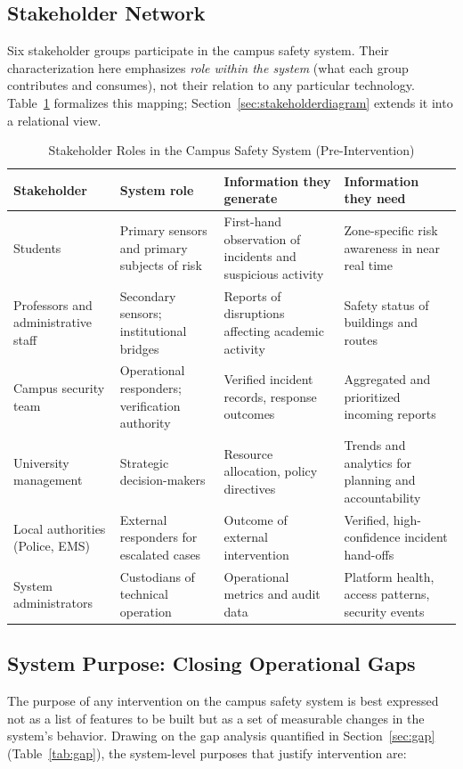 \documentclass[conference]{IEEEtran}
\begin{document}
\subsection{Stakeholder Network}
\label{sec:stakeholders}
Six stakeholder groups participate in the campus safety system. Their
characterization here emphasizes \emph{role within the system} (what
each group contributes and consumes), not their relation to any
particular technology. Table~\ref{tab:stakeholders} formalizes this
mapping; Section~\ref{sec:stakeholderdiagram} extends it into a
relational view.

\begin{table}[t]
\caption{Stakeholder Roles in the Campus Safety System (Pre-Intervention)}
\label{tab:stakeholders}
\centering
\renewcommand{\arraystretch}{1.2}
\begin{tabular}{p{2.9cm}p{4.2cm}p{4.6cm}p{4.4cm}}
\toprule
\textbf{Stakeholder} & \textbf{System role} & \textbf{Information they generate} & \textbf{Information they need} \\
\midrule
Students & Primary sensors and primary subjects of risk & First-hand observation of incidents and suspicious activity & Zone-specific risk awareness in near real time \\
Professors and administrative staff & Secondary sensors; institutional bridges & Reports of disruptions affecting academic activity & Safety status of buildings and routes \\
Campus security team & Operational responders; verification authority & Verified incident records, response outcomes & Aggregated and prioritized incoming reports \\
University management & Strategic decision-makers & Resource allocation, policy directives & Trends and analytics for planning and accountability \\
Local authorities (Police, EMS) & External responders for escalated cases & Outcome of external intervention & Verified, high-confidence incident hand-offs \\
System administrators & Custodians of technical operation & Operational metrics and audit data & Platform health, access patterns, security events \\
\bottomrule
\end{tabular}
\end{table}

\subsection{System Purpose: Closing Operational Gaps}
The purpose of any intervention on the campus safety system is best
expressed not as a list of features to be built but as a set of
measurable changes in the system's behavior. Drawing on the gap
analysis quantified in Section~\ref{sec:gap} (Table~\ref{tab:gap}),
the system-level purposes that justify intervention are:
\end{document}
